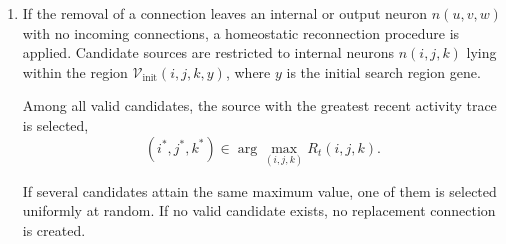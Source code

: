 \documentclass[12pt,a4paper]{article}
\begin{document}
\begin{enumerate}
\begin{figure}[H]

		\caption{\footnotesize{Temporal order of the operations affecting existing connections. Input and internal sources share the plasticity steps but differ in transmission and in the final weight treatment.}}
	\end{figure}

	\item If the removal of a connection leaves an internal or output neuron $n(u,v,w)$ with no incoming connections, a homeostatic reconnection procedure is applied. Candidate sources are restricted to internal neurons $n(i,j,k)$ lying within the region $\mathcal{V}_{\text{init}}(i, j, k, y)$, where $y$ is the initial search region gene.
	
	Among all valid candidates, the source with the greatest recent activity trace is selected,
	$$(i^\ast,j^\ast,k^\ast) \in \arg\max_{(i,j,k)} R_t(i,j,k).$$

	If several candidates attain the same maximum value, one of them is selected uniformly at random. If no valid candidate exists, no replacement connection is created.


\end{enumerate}
\end{document}
